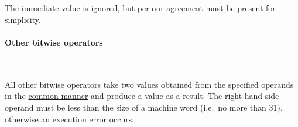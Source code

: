 \paragraph{}\

The immediate value is ignored, but per our agreement must be present for simplicity.

\vspace{-0.35cm}
\paragraph{Other bitwise operators}\

All other bitwise operators take two  values obtained from
the specified operands in the \hyperlink{types:twos_complement}{common manner}
and produce a  value as a result.
The right hand side operand must be less than the size of a machine word
(i.e.\ no more than 31), otherwise an execution error occurs.
